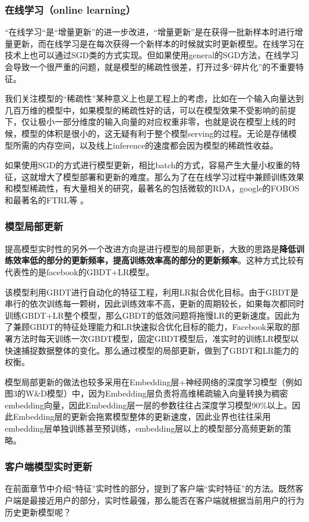 \documentclass[12pt]{article}
\begin{document}
\subsubsection{在线学习（online learning）}
“在线学习“是“增量更新”的进一步改进，“增量更新”是在获得一批新样本时进行增量更新，而在线学习是在每次获得一个新样本的时候就实时更新模型。在线学习在技术上也可以通过SGD类的方式实现。但如果使用general的SGD方法，在线学习会导致一个很严重的问题，就是模型的稀疏性很差，打开过多“碎片化”的不重要特征。

我们关注模型的“稀疏性”某种意义上也是工程上的考虑，比如在一个输入向量达到几百万维的模型中，如果模型的稀疏性好的话，可以在模型效果不受影响的前提下，仅让极小一部分维度的输入向量的对应权重非零，也就是说在模型上线的时候，模型的体积是很小的，这无疑有利于整个模型serving的过程。无论是存储模型所需的内存空间，以及线上inference的速度都会因为模型的稀疏性收益。

如果使用SGD的方式进行模型更新，相比batch的方式，容易产生大量小权重的特征，这就增大了模型部署和更新的难度。那么为了在在线学习过程中兼顾训练效果和模型稀疏性，有大量相关的研究，最著名的包括微软的RDA，google的FOBOS和最著名的FTRL等 。

\subsubsection{模型局部更新}
提高模型实时性的另外一个改进方向是进行模型的局部更新，大致的思路是\textbf{降低训练效率低的部分的更新频率，提高训练效率高的部分的更新频率}。这种方式比较有代表性的是facebook的GBDT+LR模型。

该模型利用GBDT进行自动化的特征工程，利用LR拟合优化目标。由于GBDT是串行的依次训练每一颗树，因此训练效率不高，更新的周期较长，如果每次都同时训练GBDT+LR整个模型，那么GBDT的低效问题将拖慢LR的更新速度。因此为了兼顾GBDT的特征处理能力和LR快速拟合优化目标的能力，Facebook采取的部署方法时每天训练一次GBDT模型，固定GBDT模型后，准实时的训练LR模型以快速捕捉数据整体的变化。那么通过模型的局部更新，做到了GBDT和LR能力的权衡。

模型局部更新的做法也较多采用在Embedding层+神经网络的深度学习模型（例如图3的W\&D模型）中，因为Embedding层负责将高维稀疏输入向量转换为稠密embedding向量，因此Embedding层一层的参数往往占深度学习模型90\%以上。因此Embedding层的更新会拖累模型整体的更新速度，因此业界也往往采用embedding层单独训练甚至预训练，embedding层以上的模型部分高频更新的策略。

\subsubsection{客户端模型实时更新}
在前面章节中介绍“特征”实时性的部分，提到了客户端“实时特征”的方法。既然客户端是最接近用户的部分，实时性最强，那么能否在客户端就根据当前用户的行为历史更新模型呢？
\end{document}
